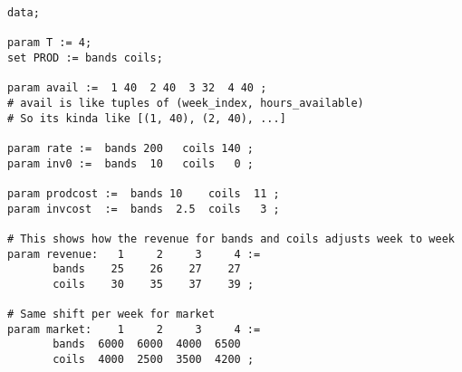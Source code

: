 \begin{lstlisting}
data;

param T := 4;
set PROD := bands coils;

param avail :=  1 40  2 40  3 32  4 40 ;
# avail is like tuples of (week_index, hours_available)
# So its kinda like [(1, 40), (2, 40), ...]

param rate :=  bands 200   coils 140 ;
param inv0 :=  bands  10   coils   0 ;

param prodcost :=  bands 10    coils  11 ;
param invcost  :=  bands  2.5  coils   3 ;

# This shows how the revenue for bands and coils adjusts week to week
param revenue:   1     2     3     4 :=
       bands    25    26    27    27
       coils    30    35    37    39 ;

# Same shift per week for market
param market:    1     2     3     4 :=
       bands  6000  6000  4000  6500
       coils  4000  2500  3500  4200 ;
\end{lstlisting}